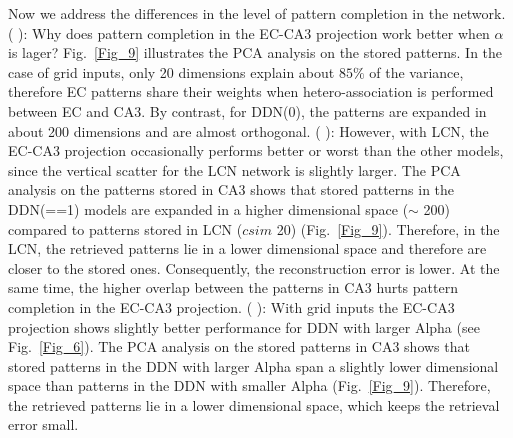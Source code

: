 \documentclass[utf8]{frontiersSCNS} %
\newcommand{\RN}[1]{%
  \textup{\uppercase\expandafter{\romannumeral#1}}%
}
\begin{document}
Now we address the differences in the level of pattern completion in the network. (\RN{1}): Why does pattern completion in the EC-CA3 projection work better when $\alpha$ is lager? Fig.~\ref{Fig_9} illustrates the PCA analysis on the stored patterns. In the case of grid inputs, only 20 dimensions explain about $85 \%$ of the variance, therefore EC patterns share their weights when hetero-association is performed between EC and CA3. By contrast, for DDN(0), the patterns are expanded in about 200 dimensions and are almost orthogonal. (\RN{2}): 
However, with LCN, the EC-CA3 projection occasionally performs better or worst than the other models, since the vertical scatter for the LCN network is slightly larger. The PCA analysis on the patterns stored in CA3 shows that stored patterns in the DDN(==1) models are expanded in a higher dimensional space ($\sim$ 200) compared to patterns stored in LCN ($csim$ 20) (Fig.~\ref{Fig_9}). Therefore, in the LCN, the retrieved patterns lie in a lower dimensional space and therefore are closer to the stored ones. Consequently, the reconstruction error is lower. At the same time, the higher overlap between the patterns in CA3 hurts pattern completion in the EC-CA3 projection. (\RN{3}): With grid inputs the EC-CA3 projection shows slightly better performance for DDN with larger Alpha (see Fig.~\ref{Fig_6}). The PCA analysis on the stored patterns in CA3 shows that stored patterns in the DDN with larger Alpha span a slightly lower dimensional space than patterns in the DDN with smaller Alpha (Fig.~\ref{Fig_9}). Therefore, the retrieved patterns lie in a lower dimensional space, which keeps the retrieval error small.
\end{document}
